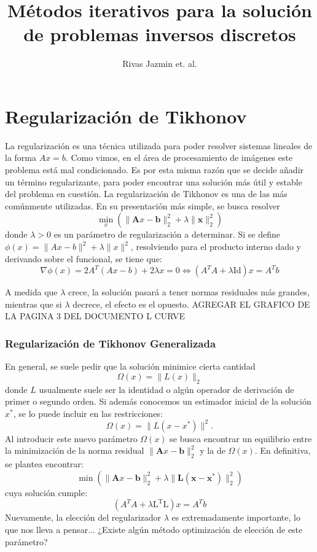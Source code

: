 \documentclass[12pt, oneside]{book}
\title{Métodos iterativos para la solución de problemas inversos discretos}
\author{Rivas Jazmin et. al.}
\date{}
\begin{document}
	\maketitle
	\tableofcontents
	
	
	\chapter{Regularización de Tikhonov}
	La regularización es una técnica utilizada para poder resolver sistemas lineales de la forma $Ax = b$. Como vimos, en el área de procesamiento de imágenes este problema está mal condicionado. Es por esta misma razón que se decide añadir un término regularizante, para poder encontrar una solución más útil y estable del problema en cuestión.
	La regularización de Tikhonov es una de las más comúnmente utilizadas. En su presentación más simple, se busca resolver \\[10pt]
	 \begin{equation}
	 	\min_{x} \left( \| \mathbf{A}x - \mathbf{b} \|_2^2 + \lambda \| \mathbf{x} \|_2^2 \right)
	 \end{equation}
	 donde $\lambda > 0$ es un parámetro de regularización a determinar.
	 Si se define $\phi(x) = \|Ax - b\|^2 + \lambda \|x\|^2$, resolviendo para el producto interno dado y derivando sobre el funcional, se tiene que:
	 \[
	 	\nabla \phi(x) = 2A^T(Ax - b) + 2\lambda x = 0 \iff 
	 	\boxed{(A^TA + \lambda \mathrm{Id})x = A^Tb}
	 \]
	 
	 A medida que $\lambda$ crece, la solución pasará a tener normas residuales más grandes, mientras que si $\lambda$ decrece, el efecto es el opuesto.
	 AGREGAR EL GRAFICO DE LA PAGINA 3 DEL DOCUMENTO L CURVE
	 
	 \subsection{Regularización de Tikhonov Generalizada}
	 En general, se suele pedir que la solución minimice cierta cantidad 
	 \[
	 \Omega(x) = \| L(x) \|_2
	 \]
	 donde $L$ usualmente suele ser la identidad o algún operador de derivación de primer o segundo orden.
	 Si además conocemos un estimador inicial de la solución $x^*$, se lo puede incluir en las restricciones:
	\[
	\Omega(x) = \| L(x - x^*) \|^2.
	\]
	Al introducir este nuevo parámetro $\Omega (x)$ se busca encontrar un equilibrio entre la minimización de la norma residual  $\| \mathbf{A}x - \mathbf{b} \|_2^2$ y la de $\Omega (x)$. En definitiva, se plantea encontrar:
	 \begin{equation}
		\min \left( \| \mathbf{A}x - \mathbf{b} \|_2^2 + \lambda \| \mathbf{L(x - x^*)} \|_2^2 \right)
	\end{equation}
	cuya solución cumple: 
	\[
	{(A^TA + \lambda \mathrm{L^TL})x = A^Tb}
	\]
	 Nuevamente, la elección del regularizador $\lambda$ es extremadamente importante, lo que nos lleva a pensar... ¿Existe algún método optimización de elección de este parámetro?
	
\end{document}
